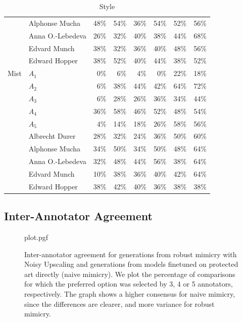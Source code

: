\documentclass{article}
\begin{document}
\begin{table}[h]
\begin{subtable}{\textwidth}
{\begin{tabular}{llrrrrrr}
     & Alphonse Mucha & 48\% &             54\% & 36\% &     54\% &            52\% &      56\% \\
     & Anna O.-Lebedeva & 26\% &             32\% & 40\% &     38\% &            44\% &      68\% \\
     & Edvard Munch & 38\% &             32\% & 36\% &     40\% &            48\% &      56\% \\
     & Edward Hopper & 38\% &             52\% & 40\% &     44\% &            38\% &      52\% \\ \midrule
Mist & $A_1$ &  0\% &              6\% &  4\% &      0\% &            22\% &      18\% \\
     & $A_2$ &  6\% &             38\% & 44\% &     42\% &            64\% &      72\% \\
     & $A_3$ &  6\% &             28\% & 26\% &     36\% &            34\% &      44\% \\
     & $A_4$ & 36\% &             58\% & 46\% &     52\% &            48\% &      54\% \\
     & $A_5$ &  4\% &             14\% & 18\% &     26\% &            58\% &      56\% \\
     & Albrecht Durer & 28\% &             32\% & 24\% &     36\% &            50\% &      60\% \\
     & Alphonse Mucha & 34\% &             50\% & 34\% &     50\% &            48\% &      64\% \\
     & Anna O.-Lebedeva & 32\% &             48\% & 44\% &     56\% &            38\% &      64\% \\
     & Edvard Munch & 10\% &             38\% & 36\% &     40\% &            42\% &      64\% \\
     & Edward Hopper & 38\% &             42\% & 40\% &     36\% &            38\% &      38\% \\
\bottomrule
\end{tabular}}

\caption{Style}
\end{subtable}


\label{tab:resultsperartistfull}
\end{table}

\clearpage

\subsection{Inter-Annotator Agreement}

\begin{figure}[h]
    \centering
    {plot.pgf}
    \caption{Inter-annotator agreement for generations from robust mimicry with Noisy Upscaling and generations from models finetuned on protected art directly (naive mimicry). We plot the percentage of comparisons for which the preferred option was selected by 3, 4 or 5 annotators, respectively. The graph shows a higher consensus for naive mimicry, since the differences are clearer, and more variance for robust mimicry.}
    \label{fig:voteagreement}
\end{figure}
\end{document}
